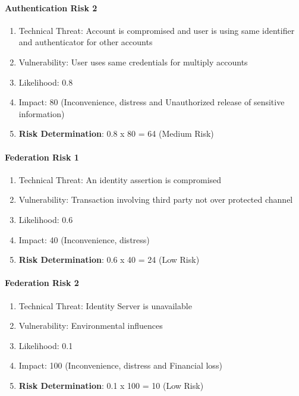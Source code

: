 \paragraph{Authentication Risk 2}
\begin{enumerate}
	\item Technical Threat: Account is compromised and user is using same identifier and authenticator for other accounts
	\item Vulnerability: User uses same credentials for multiply accounts
	\item Likelihood: 0.8
	\item Impact: 80 (Inconvenience, distress and Unauthorized release of sensitive information)
	\item \textbf{Risk Determination}: 0.8 x 80 = 64 (Medium Risk)
\end{enumerate}

\paragraph{Federation Risk 1 }
\begin{enumerate}
	\item Technical Threat: An identity assertion is compromised
	\item Vulnerability: Transaction involving third party not over protected channel
	\item Likelihood: 0.6
	\item Impact: 40 (Inconvenience, distress)
	\item \textbf{Risk Determination}: 0.6 x 40 = 24 (Low Risk)
\end{enumerate}

\paragraph{Federation Risk 2 }
\begin{enumerate}
	\item Technical Threat: Identity Server is unavailable
	\item Vulnerability: Environmental influences 
	\item Likelihood: 0.1
	\item Impact: 100 (Inconvenience, distress and Financial loss)
	\item \textbf{Risk Determination}: 0.1 x 100 = 10 (Low Risk)
\end{enumerate}


